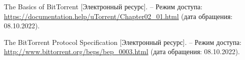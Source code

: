 
\begingroup
\renewcommand{\section}[2]{}
\begin{thebibliography}{}
	
The Basics of BitTorrent [Электронный ресурс]. -- Режим доступа: \url {https://documentation.help/uTorrent/Chapter02_01.html} (дата обращения: 08.10.2022).

The BitTorrent Protocol Specification [Электронный ресурс]. -- Режим доступа: \url {http://www.bittorrent.org/beps/bep_0003.html} (дата обращения: 08.10.2022).

\end{thebibliography}
\endgroup